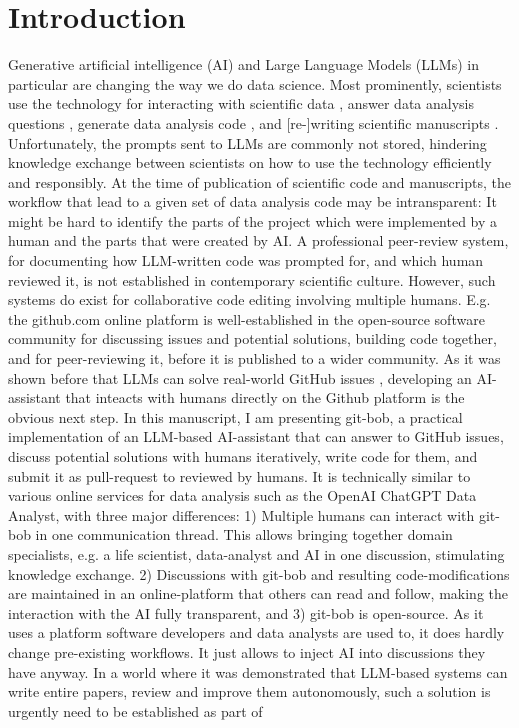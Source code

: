 \documentclass{ecai}
\begin{document}

\section{Introduction}

Generative artificial intelligence (AI) and Large Language Models (LLMs) in particular are changing the way we do data science. Most prominently, scientists use the technology for interacting with scientific data \citep{Royer2023}, answer data analysis questions \citep{Lai2022DS1000, lei2024bioimage}, generate data analysis code \citep{royer2023omega, benchmark_llm_bia, chen2021evaluating}, and [re-]writing scientific manuscripts \citep{lu2024aiscientist}. Unfortunately, the prompts sent to LLMs are commonly not stored, hindering knowledge exchange between scientists on how to use the technology efficiently and responsibly. At the time of publication of scientific code and manuscripts, the workflow that lead to a given set of data analysis code may be intransparent: It might be hard to identify the parts of the project which were implemented by a human and the parts that were created by AI. A professional peer-review system, for documenting how LLM-written code was prompted for, and which human reviewed it, is not established in contemporary scientific culture. However, such systems do exist for collaborative code editing involving multiple humans. E.g. the github.com online platform is well-established in the open-source software community for discussing issues and potential solutions, building code together, and for peer-reviewing it, before it is published to a wider community. As it was shown before that LLMs can solve real-world GitHub issues \citep{jimenez2024swebenchlanguagemodelsresolve}, developing an AI-assistant that inteacts with humans directly on the Github platform is the obvious next step. In this manuscript, I am presenting git-bob, a practical implementation of an LLM-based AI-assistant that can answer to GitHub issues, discuss potential solutions with humans iteratively, write code for them, and submit it as pull-request to reviewed by humans. It is technically similar to various online services for data analysis such as the OpenAI ChatGPT Data Analyst, with three major differences: 1) Multiple humans can interact with git-bob in one communication thread. This allows bringing together domain specialists, e.g. a life scientist, data-analyst and AI in one discussion, stimulating knowledge exchange. 2) Discussions with git-bob and resulting code-modifications are maintained in an online-platform that others can read and follow, making the interaction with the AI fully transparent, and 3) git-bob is open-source. As it uses a platform software developers and data analysts are used to, it does hardly change pre-existing workflows. It just allows to inject AI into discussions they have anyway. In a world where it was demonstrated that LLM-based systems can write entire papers, review and improve them \citep{lu2024aiscientist} autonomously, such a solution is urgently need to be established as part of 
\end{document}
